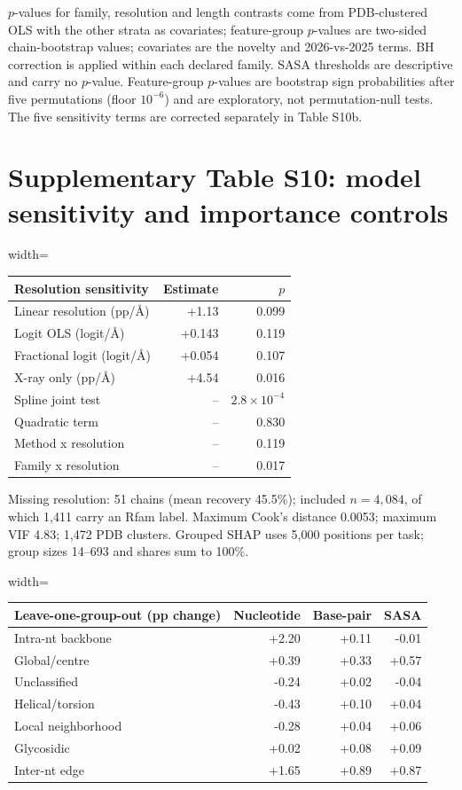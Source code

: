 \documentclass[pdflatex,sn-nature]{sn-jnl}
\begin{document}
$p$-values for family, resolution and length contrasts come from PDB-clustered OLS with
the other strata as covariates; feature-group $p$-values are two-sided chain-bootstrap
values; covariates are the novelty and 2026-vs-2025 terms. BH correction is applied
within each declared family. SASA thresholds are descriptive and carry no $p$-value. Feature-group $p$-values are bootstrap sign probabilities after five permutations (floor $10^{-6}$) and are exploratory, not permutation-null tests. The five sensitivity terms are corrected separately in Table S10b.

\section*{Supplementary Table S10: model sensitivity and importance controls}

\begingroup\scriptsize
\begin{adjustbox}{width=\textwidth}
\begin{tabular}{lrr}
\toprule
Resolution sensitivity & Estimate & $p$ \\
\midrule
Linear resolution (pp/\AA) & +1.13 & 0.099 \\
Logit OLS (logit/\AA) & +0.143 & 0.119 \\
Fractional logit (logit/\AA) & +0.054 & 0.107 \\
X-ray only (pp/\AA) & +4.54 & 0.016 \\
Spline joint test & -- & $2.8\times10^{-4}$ \\
Quadratic term & -- & 0.830 \\
Method x resolution & -- & 0.119 \\
Family x resolution & -- & 0.017 \\
\bottomrule
\end{tabular}
\end{adjustbox}
\endgroup

Missing resolution: 51 chains (mean recovery 45.5\%); included $n=4{,}084$, of which
1{,}411 carry an Rfam label. Maximum Cook's distance 0.0053; maximum VIF 4.83; 1,472 PDB clusters. Grouped SHAP uses 5,000 positions per task; group sizes 14--693 and shares sum to 100\%.

\begingroup\scriptsize
\begin{adjustbox}{width=\textwidth}
\begin{tabular}{lrrr}
\toprule
Leave-one-group-out (pp change) & Nucleotide & Base-pair & SASA \\
\midrule
Intra-nt backbone & +2.20 & +0.11 & -0.01 \\
Global/centre & +0.39 & +0.33 & +0.57 \\
Unclassified & -0.24 & +0.02 & -0.04 \\
Helical/torsion & -0.43 & +0.10 & +0.04 \\
Local neighborhood & -0.28 & +0.04 & +0.06 \\
Glycosidic & +0.02 & +0.08 & +0.09 \\
Inter-nt edge & +1.65 & +0.89 & +0.87 \\
\bottomrule
\end{tabular}
\end{adjustbox}
\endgroup
\end{document}
